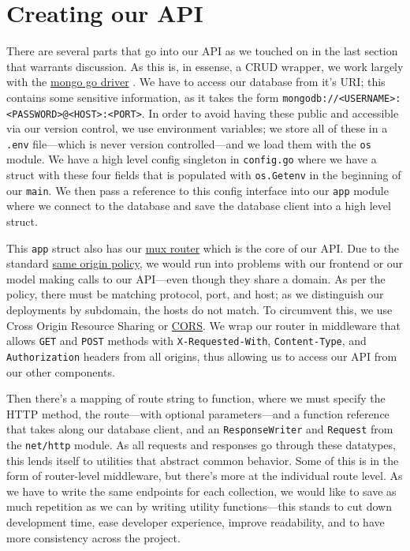 \documentclass[11pt, twoside, reqno]{book}
\begin{document}
\section{Creating our API}

There are several parts that go into our API as we touched on in the last section that warrants discussion. As this is, in essense, a CRUD wrapper, we work largely with the \href{https://godoc.org/go.mongodb.org/mongo-driver/mongo}{mongo go driver} \cite{mongoGoD17:online}. We have to access our database from it's URI; this contains some sensitive information, as it takes the form \texttt{mongodb://<USERNAME>:<PASSWORD>@<HOST>:<PORT>}. In order to avoid having these public and accessible via our version control, we use environment variables; we store all of these in a \texttt{.env} file—which is never version controlled—and we load them with the \texttt{os} module. We have a high level config singleton in \texttt{config.go} where we have a struct with these four fields that is populated with \texttt{os.Getenv} in the beginning of our \texttt{main}. We then pass a reference to this config interface into our \texttt{app} module where we connect to the database and save the database client into a high level struct.

This \texttt{app} struct also has our \href{http://www.gorillatoolkit.org/pkg/mux}{mux router} which is the core of our API. Due to the standard \href{https://developer.mozilla.org/en-US/docs/Web/Security/Same-origin_policy}{same origin policy}, we would run into problems with our frontend or our model making calls to our API—even though they share a domain. As per the policy, there must be matching protocol, port, and host; as we distinguish our deployments by subdomain, the hosts do not match. To circumvent this, we use Cross Origin Resource Sharing or \href{https://developer.mozilla.org/en-US/docs/Web/HTTP/CORS}{CORS}. We wrap our router in middleware that allows \texttt{GET} and \texttt{POST} methods with \texttt{X-Requested-With}, \texttt{Content-Type}, and \texttt{Authorization} headers from all origins, thus allowing us to access our API from our other components.

Then there's a mapping of route string to function, where we must specify the HTTP method, the route—with optional parameters—and a function reference that takes along our database client, and an \texttt{ResponseWriter} and \texttt{Request} from the \texttt{net/http} module. As all requests and responses go through these datatypes, this lends itself to utilities that abstract common behavior. Some of this is in the form of router-level middleware, but there's more at the individual route level. As we have to write the same endpoints for each collection, we would like to save as much repetition as we can by writing utility functions—this stands to cut down development time, ease developer experience, improve readability, and to have more consistency across the project.
\end{document}
